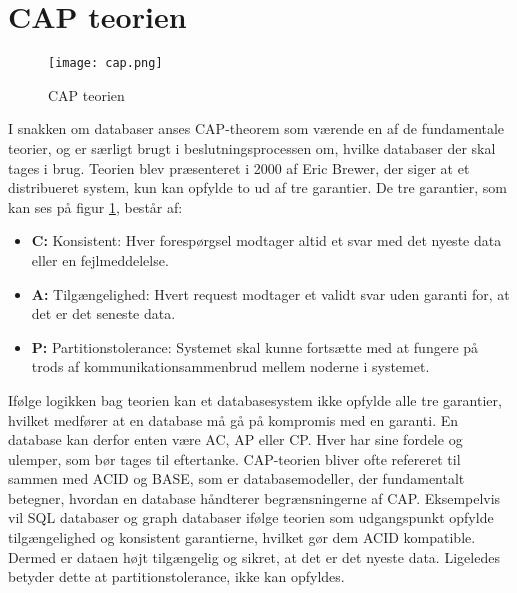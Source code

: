 \section{CAP teorien}
\begin{figure}[H]
    \centering
    \texttt{[image: cap.png]}
    \caption{CAP teorien}
    \label{fig::cap}
\end{figure}

I snakken om databaser anses CAP-theorem som værende en af de fundamentale teorier, og er særligt brugt i beslutningsprocessen om, hvilke databaser der skal tages i brug. Teorien blev præsenteret i 2000 af Eric Brewer\cite{capibm}, der siger at et distribueret system, kun kan opfylde to ud af tre garantier. De tre garantier, som kan ses på figur \ref{fig::cap}, består af: 
\begin{itemize}
    \item \textbf{C:} Konsistent: Hver forespørgsel modtager altid et svar med det nyeste data eller en fejlmeddelelse.
    \item \textbf{A:} Tilgængelighed: Hvert request modtager et validt svar uden garanti for, at det er det seneste data.
    \item \textbf{P:} Partitionstolerance: Systemet skal kunne fortsætte med at fungere på trods af kommunikationsammenbrud mellem noderne i systemet.  
\end{itemize}
Ifølge logikken bag teorien kan et databasesystem ikke opfylde alle tre garantier, hvilket medfører at en database må gå på kompromis med en garanti. En database kan derfor enten være AC, AP eller CP. Hver har sine fordele og ulemper, som bør tages til eftertanke. CAP-teorien bliver ofte refereret til sammen med ACID og BASE, som er databasemodeller, der fundamentalt betegner, hvordan en database håndterer begrænsningerne af CAP. Eksempelvis vil SQL databaser og graph databaser ifølge teorien som udgangspunkt opfylde tilgængelighed og konsistent garantierne, hvilket gør dem ACID kompatible. Dermed er dataen højt tilgængelig og sikret, at det er det nyeste data. Ligeledes betyder dette at partitionstolerance, ikke kan opfyldes. 